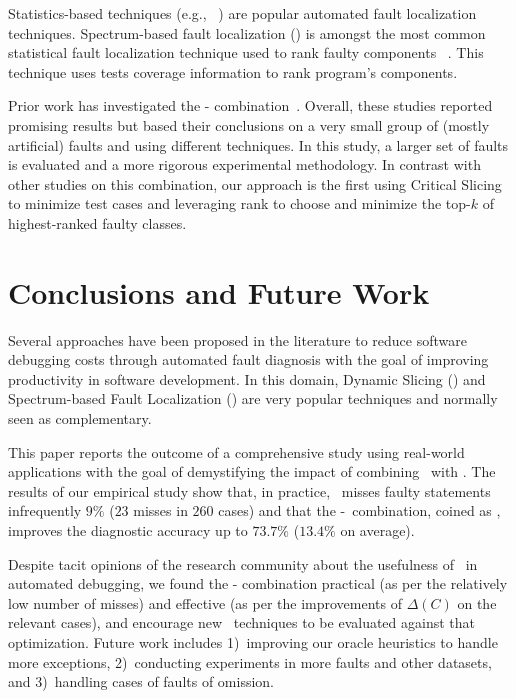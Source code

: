 \documentclass{article}
\begin{document}
Statistics-based techniques (e.g., ~\cite{Pearson:2017:EIF:3097368.3097441}) are
popular automated fault localization techniques. Spectrum-based fault
localization (\sfl{}) is amongst the most common statistical fault localization
technique used to rank faulty components
~\cite{7390282,DBLP:conf/kbse/JonesH05,DBLP:journals/smr/LuciaLJTB14,DBLP:journals/jss/AbreuZGG09}.
This technique uses tests coverage information to rank program's components.

Prior work has investigated the \ds{}-\sfl{}
combination~\cite{Wotawa:2010:FLB:1848650.1849235,Alves:2011:FUD:2190078.2190115,DBLP:conf/ecai/HoferW12,lei-mao-dai-wang-2012,slicing-sfl-repair,christi2018reduce}.
Overall, these studies reported promising results but based their conclusions
on a very small group of (mostly artificial) faults and using different
techniques. In this
study, a larger set of faults is evaluated and a more rigorous experimental
methodology.
In contrast with other studies on this combination,
our approach is the first using Critical Slicing to minimize test cases
and leveraging \sfl{} rank to choose and minimize the top-$k$ of
highest-ranked faulty classes.



\section{Conclusions and Future Work}
\label{sec:conc}
%

Several approaches have been proposed in the literature to reduce
software debugging costs through automated fault diagnosis with the
goal of improving productivity in software development. In this
domain, Dynamic Slicing (\ds) and Spectrum-based Fault Localization
(\sfl) are very popular techniques and normally seen as complementary.

This paper reports the outcome of a comprehensive study using
real-world applications with the goal of demystifying the impact of
combining \ds~with \sfl. The results of our empirical study show that,
in practice, \ds\ misses faulty statements infrequently $9\%$ ($23$
misses in $260$ cases) and that the \ds-\sfl~combination, coined as
, improves the diagnostic accuracy up to $73.7\%$ ($13.4\%$
on average).

Despite tacit opinions of the research community about the usefulness
of \ds~in automated debugging, we found the \ds{}-\sfl{} combination
practical (as per the relatively low number of misses) and effective
(as per the improvements of $\Delta(C)$ on the relevant cases), and
encourage new \sfl~techniques to be evaluated against that
optimization.  Future work includes 1)~improving our oracle heuristics
to handle more exceptions, 2)~conducting experiments in more \dfj{}
faults and other datasets, and 3)~handling cases of faults of
omission.
\end{document}
